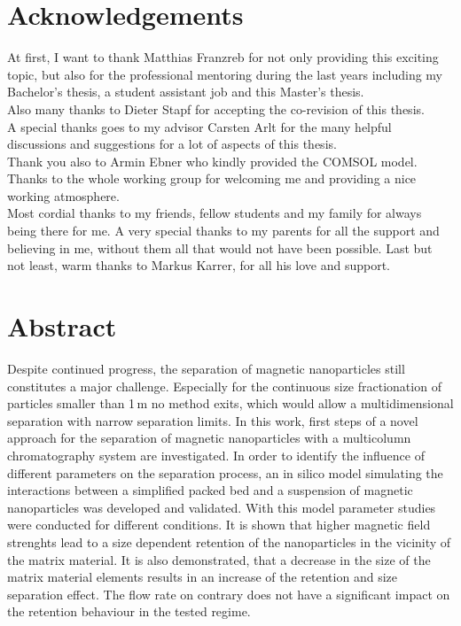 \chapter*{Acknowledgements}

At first, I want to thank Matthias Franzreb for not only providing this exciting topic, but also for the professional mentoring during the last years including my Bachelor’s thesis, a student assistant job and this Master’s thesis.\newline \\
Also many thanks to Dieter Stapf for accepting the co-revision of this thesis.\newline \\
A special thanks goes to my advisor Carsten Arlt for the many helpful discussions and suggestions for a lot of aspects of this thesis.\newline \\
Thank you also to Armin Ebner who kindly provided the COMSOL model.\newline \\
Thanks to the whole working group for welcoming me and providing a nice working  atmosphere.\newline \\
Most cordial thanks to my friends, fellow students and my family for always being there for me. A very special thanks to my parents for all the support and believing in me, without them all that would not have been possible. Last but not least, warm thanks to Markus Karrer, for all his love and support.

\newpage

\chapter{Abstract}
\label{ch:abstract_en}

Despite continued progress, the separation of magnetic nanoparticles still constitutes a major challenge. Especially for the continuous size fractionation of particles smaller than 1\,\textmu m no method exits, which would allow a multidimensional separation with narrow separation limits. In this work, first steps of a novel approach for the separation of magnetic nanoparticles with a multicolumn chromatography system are investigated. In order to identify the influence of different parameters on the separation process, an in silico model simulating the interactions between a simplified packed bed and a suspension of magnetic nanoparticles was developed and validated. With this model parameter studies were conducted for different conditions. It is shown that higher magnetic field strenghts lead to a size dependent retention of the nanoparticles in the vicinity of the matrix material. It is also demonstrated, that a decrease in the size of the matrix material elements results in an increase of the retention and size separation effect. The flow rate on contrary does not have a significant impact on the retention behaviour in the tested regime.  

